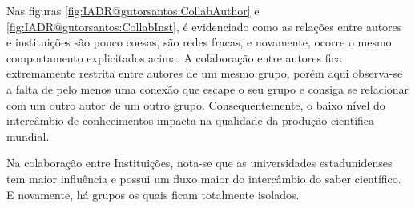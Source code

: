 Nas figuras \ref{fig:IADR@gutorsantos:CollabAuthor} e \ref{fig:IADR@gutorsantos:CollabInst}, é evidenciado como as relações entre autores e instituições são pouco coesas, são redes fracas, e novamente, ocorre o mesmo comportamento explicitados acima. A colaboração entre autores fica extremamente restrita entre autores de um mesmo grupo, porém aqui observa-se a falta de pelo menos uma conexão que escape o seu grupo e consiga se relacionar com um outro autor de um outro grupo. Consequentemente, o baixo nível do intercâmbio de conhecimentos impacta na qualidade da produção científica mundial. 


Na colaboração entre Instituições, nota-se que as universidades estadunidenses tem maior influência e possui um fluxo maior do intercâmbio do saber científico. E novamente, há grupos os quais ficam totalmente isolados. 

